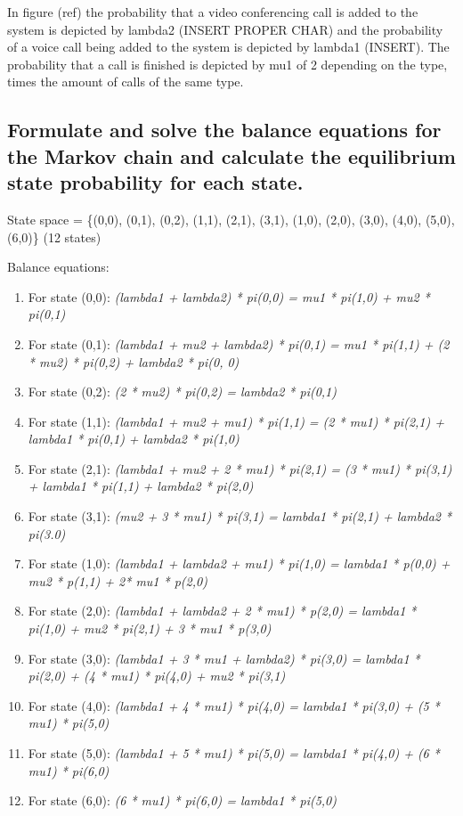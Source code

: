 \documentclass[11pt]{article}
\providecommand{\tightlist}{%
      \setlength{\itemsep}{0pt}\setlength{\parskip}{0pt}}
\begin{document}
In figure (ref) the probability that a video conferencing call is added
to the system is depicted by lambda2 (INSERT PROPER CHAR) and the
probability of a voice call being added to the system is depicted by
lambda1 (INSERT). The probability that a call is finished is depicted by
mu1 of 2 depending on the type, times the amount of calls of the same
type.

    \subsection{Formulate and solve the balance equations for the Markov
chain and calculate the equilibrium state probability for each
state.}\label{formulate-and-solve-the-balance-equations-for-the-markov-chain-and-calculate-the-equilibrium-state-probability-for-each-state.}

    State space = \{(0,0), (0,1), (0,2), (1,1), (2,1), (3,1), (1,0), (2,0),
(3,0), (4,0), (5,0), (6,0)\} (12 states)

Balance equations:

\begin{enumerate}
\def\labelenumi{\arabic{enumi}.}
\tightlist
\item
  For state (0,0): \emph{(lambda1 + lambda2) * pi(0,0) = mu1 * pi(1,0) +
  mu2 * pi(0,1)}
\item
  For state (0,1): \emph{(lambda1 + mu2 + lambda2) * pi(0,1) = mu1 *
  pi(1,1) + (2 * mu2) * pi(0,2) + lambda2 * pi(0, 0)}
\item
  For state (0,2): \emph{(2 * mu2) * pi(0,2) = lambda2 * pi(0,1)}
\item
  For state (1,1): \emph{(lambda1 + mu2 + mu1) * pi(1,1) = (2 * mu1) *
  pi(2,1) + lambda1 * pi(0,1) + lambda2 * pi(1,0)}
\item
  For state (2,1): \emph{(lambda1 + mu2 + 2 * mu1) * pi(2,1) = (3 * mu1)
  * pi(3,1) + lambda1 * pi(1,1) + lambda2 * pi(2,0)}
\item
  For state (3,1): \emph{(mu2 + 3 * mu1) * pi(3,1) = lambda1 * pi(2,1) +
  lambda2 * pi(3.0)}
\item
  For state (1,0): \emph{(lambda1 + lambda2 + mu1) * pi(1,0) = lambda1 *
  p(0,0) + mu2 * p(1,1) + 2* mu1 * p(2,0)}
\item
  For state (2,0): \emph{(lambda1 + lambda2 + 2 * mu1) * p(2,0) =
  lambda1 * pi(1,0) + mu2 * pi(2,1) + 3 * mu1 * p(3,0)}
\item
  For state (3,0): \emph{(lambda1 + 3 * mu1 + lambda2) * pi(3,0) =
  lambda1 * pi(2,0) + (4 * mu1) * pi(4,0) + mu2 * pi(3,1)}
\item
  For state (4,0): \emph{(lambda1 + 4 * mu1) * pi(4,0) = lambda1 *
  pi(3,0) + (5 * mu1) * pi(5,0)}
\item
  For state (5,0): \emph{(lambda1 + 5 * mu1) * pi(5,0) = lambda1 *
  pi(4,0) + (6 * mu1) * pi(6,0)}
\item
  For state (6,0): \emph{(6 * mu1) * pi(6,0) = lambda1 * pi(5,0)}
\end{enumerate}
\end{document}

